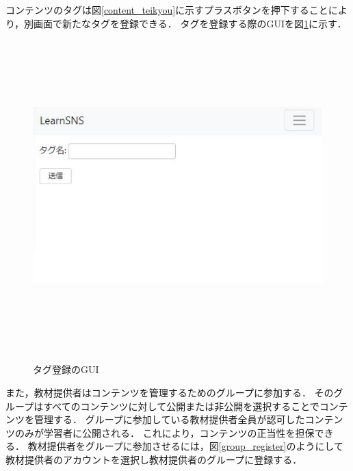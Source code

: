 \newpage
コンテンツのタグは図\ref{content_teikyou}に示すプラスボタンを押下することにより，別画面で新たなタグを登録できる．
タグを登録する際のGUIを図\ref{tag}に示す．
\begin{figure}[htbp]
    \begin{center}
        \includegraphics[width=13cm,height=12cm,keepaspectratio]{tag-crop.pdf}\\
    \end{center}
    \caption{タグ登録のGUI}
    \label{tag}
\end{figure}

また，教材提供者はコンテンツを管理するためのグループに参加する．
そのグループはすべてのコンテンツに対して公開または非公開を選択することでコンテンツを管理する．
グループに参加している教材提供者全員が認可したコンテンツのみが学習者に公開される．
これにより，コンテンツの正当性を担保できる．
教材提供者をグループに参加させるには，図\ref{group_register}のようにして教材提供者のアカウントを選択し教材提供者のグループに登録する．

